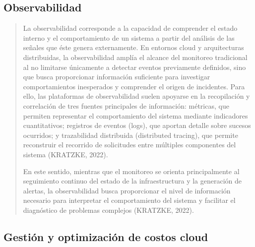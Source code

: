 \documentclass[
]{article}
\begin{document}
\subsection{\texorpdfstring{
Observabilidad}{ Observabilidad}}\label{observabilidad}

\begin{quote}
La observabilidad corresponde a la capacidad de comprender el estado
interno y el comportamiento de un sistema a partir del análisis de las
señales que éste genera externamente. En entornos cloud y arquitecturas
distribuidas, la observabilidad amplía el alcance del monitoreo
tradicional al no limitarse únicamente a detectar eventos previamente
definidos, sino que busca proporcionar información suficiente para
investigar comportamientos inesperados y comprender el origen de
incidentes. Para ello, las plataformas de observabilidad suelen apoyarse
en la recopilación y correlación de tres fuentes principales de
información: métricas, que permiten representar el comportamiento del
sistema mediante indicadores cuantitativos; registros de eventos (logs),
que aportan detalle sobre sucesos ocurridos; y trazabilidad distribuida
(distributed tracing), que permite reconstruir el recorrido de
solicitudes entre múltiples componentes del sistema (KRATZKE, 2022).

En este sentido, mientras que el monitoreo se orienta principalmente al
seguimiento continuo del estado de la infraestructura y la generación de
alertas, la observabilidad busca proporcionar el nivel de información
necesario para interpretar el comportamiento del sistema y facilitar el
diagnóstico de problemas complejos (KRATZKE, 2022).
\end{quote}

\subsection{\texorpdfstring{ Gestión y optimización de costos
cloud}{ Gestión y optimización de costos cloud}}\label{gestiuxf3n-y-optimizaciuxf3n-de-costos-cloud}
\end{document}
